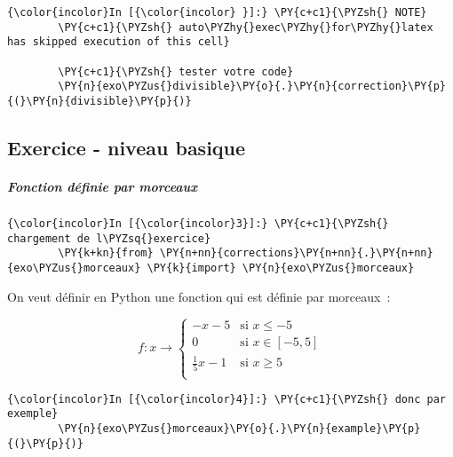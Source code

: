     \begin{Verbatim}[commandchars=\\\{\},frame=single,framerule=0.3mm,rulecolor=\color{cellframecolor}]
{\color{incolor}In [{\color{incolor} }]:} \PY{c+c1}{\PYZsh{} NOTE}
        \PY{c+c1}{\PYZsh{} auto\PYZhy{}exec\PYZhy{}for\PYZhy{}latex has skipped execution of this cell}
        
        \PY{c+c1}{\PYZsh{} tester votre code}
        \PY{n}{exo\PYZus{}divisible}\PY{o}{.}\PY{n}{correction}\PY{p}{(}\PY{n}{divisible}\PY{p}{)}
\end{Verbatim}


    \hypertarget{exercice---niveau-basique}{%
\subsection{Exercice - niveau basique}\label{exercice---niveau-basique}}

    \hypertarget{fonction-duxe9finie-par-morceaux}{%
\subparagraph{Fonction définie par
morceaux}\label{fonction-duxe9finie-par-morceaux}}

    \begin{Verbatim}[commandchars=\\\{\},frame=single,framerule=0.3mm,rulecolor=\color{cellframecolor}]
{\color{incolor}In [{\color{incolor}3}]:} \PY{c+c1}{\PYZsh{} chargement de l\PYZsq{}exercice}
        \PY{k+kn}{from} \PY{n+nn}{corrections}\PY{n+nn}{.}\PY{n+nn}{exo\PYZus{}morceaux} \PY{k}{import} \PY{n}{exo\PYZus{}morceaux}
\end{Verbatim}


    On veut définir en Python une fonction qui est définie par morceaux~:

    \[
f: x \longrightarrow \left\{
\begin{array}{ll}
-x - 5          & \mbox{si } x \leqslant -5 \\
0               & \mbox{si } x \in [-5, 5]  \\
\frac{1}{5}x -1 & \mbox{si } x \geqslant 5  \\
\end{array}
\right.
\]

    \begin{Verbatim}[commandchars=\\\{\},frame=single,framerule=0.3mm,rulecolor=\color{cellframecolor}]
{\color{incolor}In [{\color{incolor}4}]:} \PY{c+c1}{\PYZsh{} donc par exemple}
        \PY{n}{exo\PYZus{}morceaux}\PY{o}{.}\PY{n}{example}\PY{p}{(}\PY{p}{)}
\end{Verbatim}


